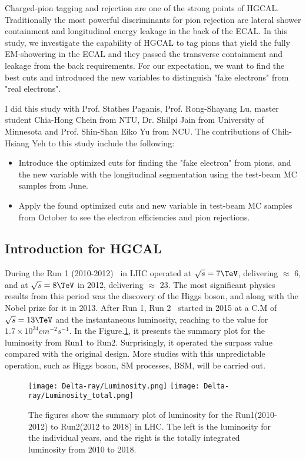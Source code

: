 \documentclass[12pt,twoside,a4paper,an,final]{cms-tdr}
\begin{document}
Charged-pion tagging and rejection are one of the strong points of HGCAL. Traditionally the most powerful discriminants for pion rejection are lateral shower containment and longitudinal energy leakage in the back of the ECAL. In this study, we investigate the capability of HGCAL to tag pions that yield the fully EM-showering in the ECAL and they passed the transverse containment and leakage from the back requirements. For our expectation, we want to find the best cuts and introduced the new variables to distinguish "fake electrons" from "real electrons".

I did this study with Prof. Stathes Paganis, Prof. Rong-Shayang Lu, master student Chia-Hong Chein from NTU, Dr. Shilpi Jain from University of Minnesota and Prof. Shin-Shan Eiko Yu from NCU.  The contributions of Chih-Hsiang Yeh to this study include the following:
\begin{itemize}
\item Introduce the optimized cuts for finding the "fake electron" from pions, and the new variable with the longitudinal segmentation using the test-beam MC samples from June.
\item Apply the found optimized cuts and new variable in test-beam MC samples from October to see the electron efficiencies and pion rejections.
\end{itemize}

\subsection{Introduction for HGCAL}
During the Run 1 (2010-2012)~\cite{GIOVANNOZZI20181} in LHC operated at $\sqrt{s} = 7\TeV$, delivering $\approx$ 6\fbinv, and at $\sqrt{s} = 8\TeV$ in 2012, delivering $\approx$ 23\fbinv. The most significant physics results from this period was the discovery of the Higgs boson, and along with the Nobel prize for it in 2013. After Run 1, Run 2~\cite{Bloom:2016mdm} started in 2015 at a C.M of $\sqrt{s} = 13\TeV$  and the instantaneous luminosity, reaching to the value for $1.7 \times 10^{34} cm^{-2} s^{-1}$. In the Figure.\ref{luminosity_1}, it presents the summary plot for the luminosity from Run1 to Run2.  Surprisingly, it operated the surpass value compared with the original design. More studies with this unpredictable operation, such as Higgs boson, SM processes, BSM, will be carried out.

\begin{figure}[!htb]
\centering 
     \texttt{[image: Delta-ray/Luminosity.png]}
     \texttt{[image: Delta-ray/Luminosity\_total.png]}
\caption{The figures show the summary plot of luminosity for the Run1(2010-2012) to Run2(2012 to 2018) in LHC. The left is the luminosity for the individual years, and the right is the totally integrated luminosity from 2010 to 2018.}
\label{luminosity_1}
\end{figure}
\end{document}
